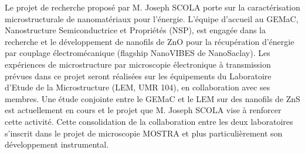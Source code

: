 Le projet de recherche proposé par M. Joseph SCOLA porte sur la caractérisation microstructurale de nanomatériaux pour l'énergie.
L'équipe d'accueil au GEMaC, Nanostructure Semiconductrice et Propriétés (NSP), est engagée dans la recherche et le développement de nanofils de ZnO pour la récupération d'énergie par couplage électromécanique (flagship NanoVIBES de NanoSaclay).
Les expériences de microstructure par microscopie électronique à transmission prévues dans ce projet seront réalisées sur les équipements du Laboratoire d'Etude de la Microstructure (LEM, UMR 104), en collaboration avec ses membres.
Une étude conjointe entre le GEMaC et le LEM sur des nanofils de ZnS est actuellement en cours et le projet que M. Joseph SCOLA vise à renforcer cette activité.
Cette consolidation de la collaboration entre les deux laboratoires s’inscrit dans le projet de microscopie MOSTRA et plus particulièrement son développement instrumental.